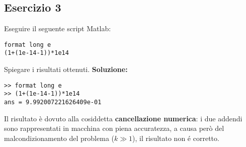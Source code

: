 \subsection{Esercizio 3}
Eseguire il seguente script Matlab:
\begin{lstlisting}
format long e
(1+(1e-14-1))*1e14
\end{lstlisting}
Spiegare i risultati ottenuti.
\newline \textbf{Soluzione:}

\begin{lstlisting}
>> format long e
>> (1+(1e-14-1))*1e14
ans = 9.992007221626409e-01
\end{lstlisting}
Il risultato è dovuto alla cosiddetta \textbf{cancellazione numerica}:
i due addendi sono rappresentati in macchina con piena accuratezza, a causa però del
malcondizionamento del problema ($k \gg 1$), il risultato non é corretto.
